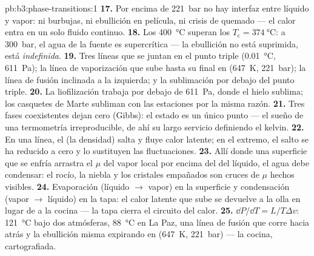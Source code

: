 \begin{solution}{pb:b3:phase-transitions:1}
\textbf{17.} Por encima de \qty{221}{bar} no hay interfaz entre líquido y
vapor: ni burbujas, ni ebullición en película, ni crisis de quemado ---
el calor entra en un solo fluido continuo.
\textbf{18.} Los \qty{400}{\celsius} superan los $T_{\text{c}} =
\qty{374}{\celsius}$: a \qty{300}{bar}, el agua de la fuente es
supercrítica --- la ebullición no está suprimida, está
\emph{indefinida}.
\textbf{19.} Tres líneas que se juntan en el punto triple
(\qty{0.01}{\celsius}, \qty{611}{Pa}); la línea de vaporización
que sube hasta su final en (\qty{647}{K}, \qty{221}{bar}); la
línea de fusión inclinada a la izquierda; y la sublimación por debajo del punto triple.
\textbf{20.} La liofilización trabaja por debajo de \qty{611}{Pa}, donde el hielo
sublima; los casquetes de Marte subliman con las estaciones por la misma razón.
\textbf{21.} Tres fases coexistentes dejan cero  (Gibbs):
el estado es un único punto --- el sueño de una termometría irreproducible,
de ahí su largo servicio definiendo el kelvin.
\textbf{22.} En una línea, el  (la densidad) salta y
fluye calor latente; en el extremo, el salto se ha reducido a cero
y lo sustituyen las fluctuaciones.
\textbf{23.} Allí donde una superficie que se enfría arrastra el $\mu$ del vapor
local por encima del del líquido, el agua debe condensar: el rocío, la niebla y
los cristales empañados son cruces de $\mu$ hechos visibles.
\textbf{24.} Evaporación (líquido $\to$ vapor) en la superficie y
condensación (vapor $\to$ líquido) en la tapa: el calor latente
que sube se devuelve a la olla en lugar de a la cocina --- la
tapa cierra el circuito del calor.
\textbf{25.} $\dd P/\dd T = L/T\Delta v$: \qty{121}{\celsius}
bajo dos atmósferas, \qty{88}{\celsius} en La Paz, una línea de fusión
que corre hacia atrás y la ebullición misma expirando en
(\qty{647}{K}, \qty{221}{bar}) --- la cocina, cartografiada.
\end{solution}
